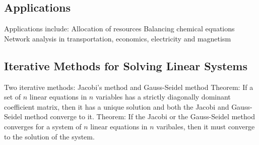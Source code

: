 \documentclass{article}
\begin{document}
    \subsection{Applications}
    \begin{outline}
        \1 Applications include: 
            \2 Allocation of resources
            \2 Balancing chemical equations 
            \2 Network analysis in transportation, economics, electricity and magnetism
    \end{outline}
    \subsection{Iterative Methods for Solving Linear Systems}
    \begin{outline}
        \1 Two iterative methods: Jacobi's method and Gauss-Seidel method 
        \1 Theorem: If a set of $n$ linear equations in $n$ variables has a strictly diagonally dominant coefficient matrix, then it has a unique solution and both the Jacobi and Gauss-Seidel method converge to it. 
        \1 Theorem: If the Jacobi or the Gauss-Seidel method converges for a system of $n$ linear equations in $n$ varibales, then it must converge to the solution of the system. 

    \end{outline}
\end{document}

